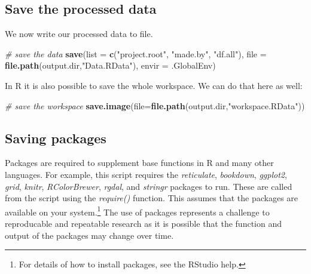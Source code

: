 \documentclass[11pt,]{article}
\newenvironment{Shaded}{\begin{snugshade}}{\end{snugshade}}
\newcommand{\CommentTok}[1]{\textcolor[rgb]{0.56,0.35,0.01}{\textit{#1}}}
\newcommand{\DataTypeTok}[1]{\textcolor[rgb]{0.13,0.29,0.53}{#1}}
\newcommand{\KeywordTok}[1]{\textcolor[rgb]{0.13,0.29,0.53}{\textbf{#1}}}
\newcommand{\NormalTok}[1]{#1}
\newcommand{\StringTok}[1]{\textcolor[rgb]{0.31,0.60,0.02}{#1}}
\let\rmarkdownfootnote\footnote%
\def\footnote{\protect\rmarkdownfootnote}
\begin{document}
\hypertarget{save-the-processed-data}{%
\subsection{Save the processed data}\label{save-the-processed-data}}

We now write our processed data to file.

\begin{Shaded}
\begin{Highlighting}[]
\CommentTok{# save the data}
\KeywordTok{save}\NormalTok{(}\DataTypeTok{list =} \KeywordTok{c}\NormalTok{(}\StringTok{"project.root"}\NormalTok{,}
              \StringTok{"made.by"}\NormalTok{,}
              \StringTok{"df.all"}\NormalTok{),}
       \DataTypeTok{file =} \KeywordTok{file.path}\NormalTok{(output.dir,}\StringTok{"Data.RData"}\NormalTok{),}
       \DataTypeTok{envir =}\NormalTok{ .GlobalEnv)}
\end{Highlighting}
\end{Shaded}

In R it is also possible to save the whole workspace. We can do that here as well:

\begin{Shaded}
\begin{Highlighting}[]
\CommentTok{# save the workspace}
\KeywordTok{save.image}\NormalTok{(}\DataTypeTok{file=}\KeywordTok{file.path}\NormalTok{(output.dir,}\StringTok{"workspace.RData"}\NormalTok{))}
\end{Highlighting}
\end{Shaded}

\hypertarget{saving-packages}{%
\subsection{Saving packages}\label{saving-packages}}

Packages are required to supplement base functions in R and many other languages. For example, this script requires the \emph{reticulate}, \emph{bookdown}, \emph{ggplot2}, \emph{grid}, \emph{knitr}, \emph{RColorBrewer}, \emph{rgdal}, and \emph{stringr} packages to run. These are called from the script using the \emph{require()} function. This assumes that the packages are available on your system.\footnote{For details of how to install packages, see the RStudio help.} The use of packages represents a challenge to reproducable and repeatable research as it is possible that the function and output of the packages may change over time.
\end{document}
